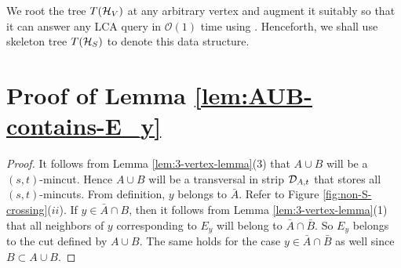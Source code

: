 
We root the tree $T({\cal H}_V)$ at any arbitrary vertex and augment it suitably so that it can answer any LCA query in $\mathcal O(1)$ time using \cite{DBLP:journals/jal/BenderFPSS05}. Henceforth, we shall use skeleton tree $T({\cal H}_S)$ to denote this data structure.

\section{Proof of Lemma \ref{lem:AUB-contains-E_y}} \label{appendix:AUB-contains-E_y}
\begin{proof}
It follows from Lemma \ref{lem:3-vertex-lemma}(3) that $A\cup B$ will be a $(s,t)$-mincut. Hence $A\cup B$ will be a transversal in strip ${\cal D}_{A,t}$ that stores all
$(s,t)$-mincuts.
From definition, $y$ belongs to $\bar{A}$. Refer to Figure \ref{fig:non-S-crossing}($ii$).  If $y\in \bar{A}\cap B$, then it follows from Lemma \ref{lem:3-vertex-lemma}(1) that all neighbors of $y$ corresponding to $E_y$ will belong to $\bar{A}\cap \bar{B}$. So $E_y$ belongs to the cut defined by $A\cup B$. The same holds for the case $y\in \bar{A}\cap\bar{B}$ as well since $B\subset A\cup B$.
\end{proof}


